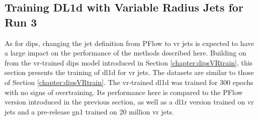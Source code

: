 \subsection{Training DL1d with Variable Radius Jets for Run 3}\label{sec:VRdl1dTrain}
As for \gls{dips}, changing the jet definition from PFlow to \gls{vr} jets is expected to have a large impact on the performance of the methods described here. Building on from the \gls{vr}-trained \gls{dips} model introduced in Section \ref{chapter:dipsVRtrain}, this section presents the training of \gls{dl1d} for \gls{vr} jets. The datasets are similar to those of Section \ref{chapter:dipsVRtrain}. The \gls{vr}-trained \gls{dl1d} was trained for 300 epochs with no signs of overtraining. Its performance here is compared to the PFlow version introduced in the previous section, as well as a \gls{dl1r} version trained on \gls{vr} jets and a pre-release \gls{gn1} trained on 20 million \gls{vr} jets. 

